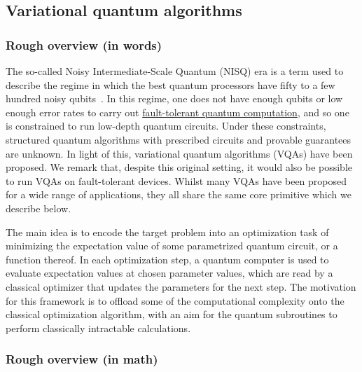 
\begin{refsection}

\section{Variational quantum algorithms}\label{prim:VQA}

\subsubsection*{Rough overview (in words)}

The so-called Noisy Intermediate-Scale Quantum (NISQ) era is a term used to describe the regime in which the best quantum processors have fifty to a few hundred noisy qubits~\cite{preskill2018QuantCompNISQEra}. In this regime, one does not have enough qubits or low enough error rates to carry out \hyperref[prim:FTQC]{fault-tolerant quantum computation}, and so one is constrained to run low-depth quantum circuits. Under these constraints, structured quantum algorithms with prescribed circuits and provable guarantees are unknown. In light of this, variational quantum algorithms (VQAs) have been proposed. We remark that, despite this original setting, it would also be possible to run VQAs on fault-tolerant devices. Whilst many VQAs have been proposed for a wide range of applications, they all share the same core primitive which we describe below. 

The main idea is to encode the target problem into an optimization task of minimizing the expectation value of some parametrized quantum circuit, or a function thereof. In each optimization step, a quantum computer is used to evaluate expectation values at chosen parameter values, which are read by a classical optimizer that updates the parameters for the next step. The motivation for this framework is to offload some of the computational complexity onto the classical optimization algorithm, with an aim for the quantum subroutines to perform classically intractable calculations.  



\subsubsection*{Rough overview (in math)} \label{sec:variational-roughoverview}


\end{refsection}
